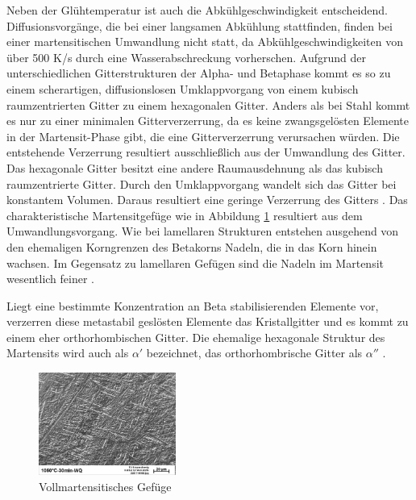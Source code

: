\documentclass[a4paper, 11pt]{tubsreprt}
\begin{document}
Neben der Glühtemperatur ist auch die Abkühlgeschwindigkeit entscheidend. Diffusionsvorgänge, die bei einer langsamen Abkühlung stattfinden, finden bei einer martensitischen Umwandlung nicht statt, da Abkühlgeschwindigkeiten von über 500 K/s durch eine Wasserabschreckung vorherschen. Aufgrund der unterschiedlichen Gitterstrukturen der Alpha- und Betaphase kommt es so zu einem scherartigen, diffusionslosen Umklappvorgang von einem kubisch raumzentrierten Gitter zu einem hexagonalen Gitter. Anders als bei Stahl kommt es nur zu einer minimalen Gitterverzerrung, da es keine zwangsgelösten Elemente in der Martensit-Phase gibt, die eine Gitterverzerrung verursachen würden. Die entstehende Verzerrung resultiert ausschließlich aus der Umwandlung des Gitter. Das hexagonale Gitter besitzt eine andere Raumausdehnung als das kubisch raumzentrierte Gitter. Durch den Umklappvorgang wandelt sich das Gitter bei konstantem Volumen. Daraus resultiert eine geringe Verzerrung des Gitters \cite{Luetjering2007}. Das charakteristische Martensitgefüge wie in Abbildung \ref{vollmartensit} resultiert aus dem Umwandlungsvorgang. Wie bei lamellaren Strukturen entstehen ausgehend von den ehemaligen Korngrenzen des Betakorns Nadeln, die in das Korn hinein wachsen. Im Gegensatz zu lamellaren Gefügen sind die Nadeln im Martensit wesentlich feiner \cite{Luetjering2007}.

Liegt eine bestimmte Konzentration an Beta stabilisierenden Elemente vor, verzerren diese metastabil geslösten Elemente das Kristallgitter und es kommt zu einem eher orthorhombischen Gitter. Die ehemalige hexagonale Struktur des Martensits wird auch als $\alpha'$ bezeichnet, das orthorhombrische Gitter als $\alpha''$ \cite{Luetjering2007}. 

\begin{figure}
\centering
\includegraphics[width=0.4\textwidth]{Bilder/Vollmartensit.jpg}
\caption{Vollmartensitisches Gefüge}
\label{vollmartensit}
\end{figure}
\end{document}
